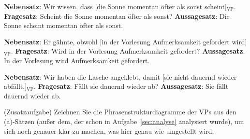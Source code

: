 \documentclass[12pt,a4paper,twoside]{article}
\newcommand{\blau}[1]{\textcolor{blau}{#1}}
\newcommand{\grau}[1]{\textcolor{grau}{#1}}
\newcommand{\Sub}[1]{\ensuremath{_{\text{#1}}}}
\newcommand{\Zeile}{\vspace{\baselineskip}}
\begin{document}
\begin{exe}
\setcounter{xnumi}{0}
  \ex
  \begin{xlist}
    \ex \textbf{Nebensatz}: \grau{Wir wissen, dass} \blau{[die Sonne momentan öfter als sonst scheint]\Sub{VP}}\grau{.}
    \ex \textbf{Fragesatz}: \blau{Scheint die Sonne momentan öfter als sonst?}
    \ex \textbf{Aussagesatz}: \blau{Die Sonne scheint momentan öfter als sonst.}
  \end{xlist}
  \Zeile
  \ex
  \begin{xlist}
    \ex \textbf{Nebensatz}: \grau{Er gähnte, obwohl} \blau{[in der Vorlesung Aufmerksamkeit gefordert wird]\Sub{VP}}\grau{.}
    \ex \textbf{Fragesatz}: \blau{Wird in der Vorlesung Aufmerksamkeit gefordert?}
    \ex \textbf{Aussagesatz}: \blau{In der Vorlesung wird Aufmerksamkeit gefordert.}
  \end{xlist}
  \Zeile
  \ex
  \begin{xlist}
    \ex \textbf{Nebensatz}: \grau{Wir haben die Lasche angeklebt, damit} \blau{[sie nicht dauernd wieder abfällt.]\Sub{VP}}\grau{.}
    \ex \textbf{Fragesatz}: \blau{Fällt sie dauernd wieder ab?}
    \ex \textbf{Aussagesatz}: \blau{Sie fällt dauernd wieder ab.}
  \end{xlist}
\end{exe}

(Zusatzaufgabe) Zeichnen Sie die Phrasenstrukturdiagramme der VPs aus den (a)-Sätzen (außer dem, der schon in Aufgabe~\ref{sec:analyse} analysiert wurde), um sich noch genauer klar zu machen, was hier genau wie umgestellt wird.

\newpage
\hspace{1em}
\newpage
\hspace{1em}
\end{document}
